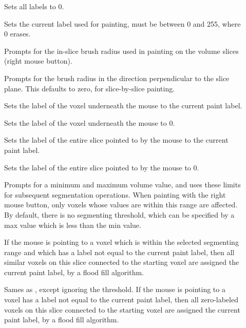 \begin{description}
\item[]  Sets all labels to 0.
\item[]  Sets the current label
    used for painting, must be between 0 and 255, where 0 erases.
\item[]  Prompts for the in-slice 
    brush radius used in painting on the volume slices (right mouse button).
\item[]  Prompts for the brush
    radius in the direction perpendicular to the slice plane.  This
    defaults to zero, for slice-by-slice painting.
\item[]  Sets the label of the voxel
    underneath the mouse to the current paint label.
\item[]  Sets the label of the voxel
    underneath the mouse to 0.
\item[]  Sets the label of the 
    entire slice pointed to by the mouse to the current paint label.
\item[]  Sets the label of the 
    entire slice pointed to by the mouse to 0.
\item[]  Prompts for a minimum and
    maximum volume value, and uses these limits for subsequent segmentation
    operations.  When painting with the right mouse button, only
    voxels whose values are within this range are affected.  By
    default, there is no segmenting threshold, which can be specified
    by a max value which is less than the min value.
\item[]  If the mouse is pointing
    to a voxel which is within the selected segmenting range and which
    has a label not equal to the current paint label, then all similar
    voxels on this slice connected
    to the starting voxel are assigned the current paint label, by a
    flood fill algorithm.
\item[]  Sames as
    , except ignoring the threshold.
    If the mouse is pointing to a voxel has a label not equal to the
    current paint label, then all
    zero-labeled voxels on this slice connected
    to the starting voxel are assigned the current paint label, by a
    flood fill algorithm.

\end{description}

